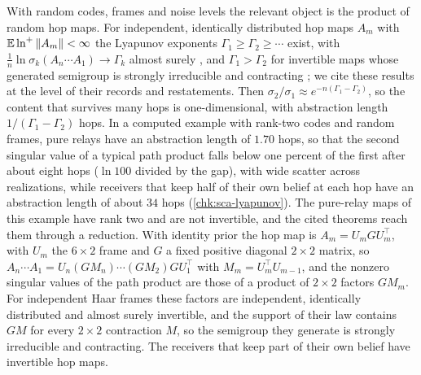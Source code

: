 With random codes, frames and noise levels the relevant object is the product of random hop maps. For independent, identically distributed hop maps $A_m$ with $\mathbb{E}\ln^+\Vert A_m\Vert<\infty$ the Lyapunov exponents $\Gamma_1\ge\Gamma_2\ge\cdots$ exist, with $\tfrac1n\ln\sigma_k(A_n\cdots A_1)\to\Gamma_k$ almost surely \citep{furstenberg1960products,oseledets1968multiplicative}, and $\Gamma_1>\Gamma_2$ for invertible maps whose generated semigroup is strongly irreducible and contracting \citep{guivarch1985frontiere,goldsheid1989lyapunov}; we cite these results at the level of their records and restatements. Then $\sigma_2/\sigma_1\approx e^{-n(\Gamma_1-\Gamma_2)}$, so the content that survives many hops is one-dimensional, with abstraction length $1/(\Gamma_1-\Gamma_2)$ hops. In a computed example with rank-two codes and random frames, pure relays have an abstraction length of $1.70$ hops, so that the second singular value of a typical path product falls below one percent of the first after about eight hops ($\ln100$ divided by the gap), with wide scatter across realizations, while receivers that keep half of their own belief at each hop have an abstraction length of about $34$ hops (\cref{chk:sca-lyapunov}). The pure-relay maps of this example have rank two and are not invertible, and the cited theorems reach them through a reduction. With identity prior the hop map is $A_m=U_mGU_m^\top$, with $U_m$ the $6\times2$ frame and $G$ a fixed positive diagonal $2\times2$ matrix, so $A_n\cdots A_1=U_n(GM_n)\cdots(GM_2)GU_1^\top$ with $M_m=U_m^\top U_{m-1}$, and the nonzero singular values of the path product are those of a product of $2\times2$ factors $GM_m$. For independent Haar frames these factors are independent, identically distributed and almost surely invertible, and the support of their law contains $GM$ for every $2\times2$ contraction $M$, so the semigroup they generate is strongly irreducible and contracting. The receivers that keep part of their own belief have invertible hop maps.

